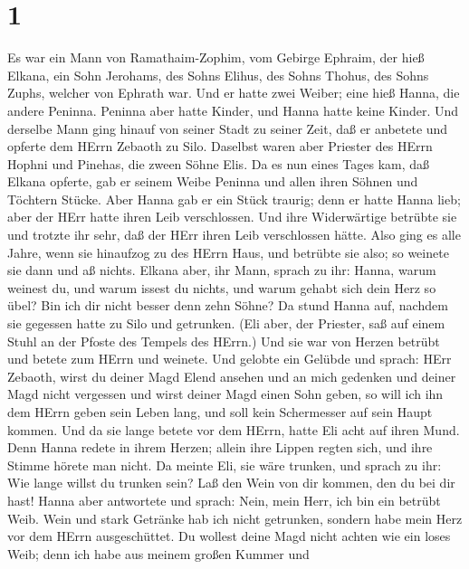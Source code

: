 \hypertarget{section}{%
\section{1}\label{section}}

 Es war ein Mann von Ramathaim-Zophim, vom Gebirge Ephraim,
der hieß Elkana, ein Sohn Jerohams, des Sohns Elihus, des Sohns Thohus,
des Sohns Zuphs, welcher von Ephrath war.  Und er hatte zwei
Weiber; eine hieß Hanna, die andere Peninna. Peninna aber hatte Kinder,
und Hanna hatte keine Kinder.  Und derselbe Mann ging hinauf
von seiner Stadt zu seiner Zeit, daß er anbetete und opferte dem HErrn
Zebaoth zu Silo. Daselbst waren aber Priester des HErrn Hophni und
Pinehas, die zween Söhne Elis.  Da es nun eines Tages kam,
daß Elkana opferte, gab er seinem Weibe Peninna und allen ihren Söhnen
und Töchtern Stücke.  Aber Hanna gab er ein Stück traurig;
denn er hatte Hanna lieb; aber der HErr hatte ihren Leib verschlossen.
 Und ihre Widerwärtige betrübte sie und trotzte ihr sehr,
daß der HErr ihren Leib verschlossen hätte.  Also ging es
alle Jahre, wenn sie hinaufzog zu des HErrn Haus, und betrübte sie also;
so weinete sie dann und aß nichts.  Elkana aber, ihr Mann,
sprach zu ihr: Hanna, warum weinest du, und warum issest du nichts, und
warum gehabt sich dein Herz so übel? Bin ich dir nicht besser denn zehn
Söhne?  Da stund Hanna auf, nachdem sie gegessen hatte zu
Silo und getrunken. (Eli aber, der Priester, saß auf einem Stuhl an der
Pfoste des Tempels des HErrn.)  Und sie war von Herzen
betrübt und betete zum HErrn und weinete.  Und gelobte ein
Gelübde und sprach: HErr Zebaoth, wirst du deiner Magd Elend ansehen und
an mich gedenken und deiner Magd nicht vergessen und wirst deiner Magd
einen Sohn geben, so will ich ihn dem HErrn geben sein Leben lang, und
soll kein Schermesser auf sein Haupt kommen.  Und da sie
lange betete vor dem HErrn, hatte Eli acht auf ihren Mund. 
Denn Hanna redete in ihrem Herzen; allein ihre Lippen regten sich, und
ihre Stimme hörete man nicht. Da meinte Eli, sie wäre trunken,
 und sprach zu ihr: Wie lange willst du trunken sein? Laß
den Wein von dir kommen, den du bei dir hast!  Hanna aber
antwortete und sprach: Nein, mein Herr, ich bin ein betrübt Weib. Wein
und stark Getränke hab ich nicht getrunken, sondern habe mein Herz vor
dem HErrn ausgeschüttet.  Du wollest deine Magd nicht
achten wie ein loses Weib; denn ich habe aus meinem großen Kummer und
